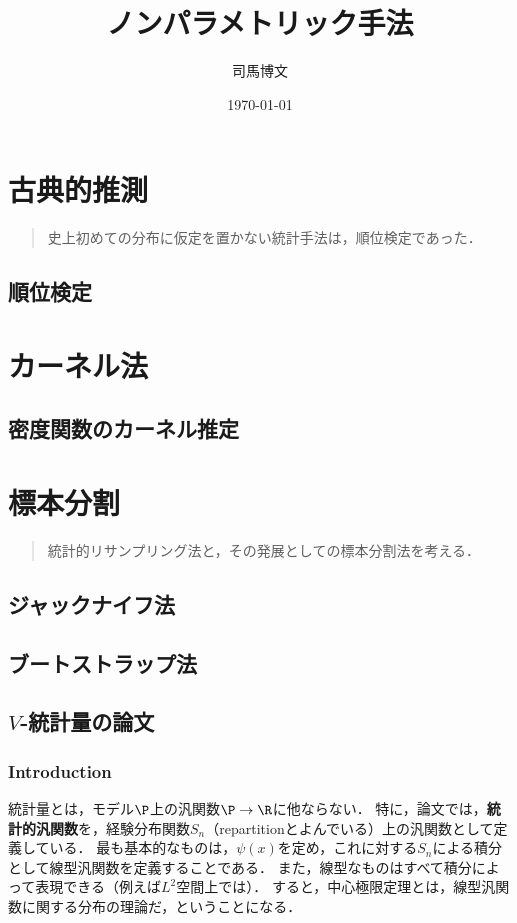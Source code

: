 \documentclass[uplatex,dvipdfmx]{jsreport}
\title{ノンパラメトリック手法}
\author{司馬博文}
\date{\today}
\begin{document}
\tableofcontents

\chapter{古典的推測}

\begin{quotation}
    史上初めての分布に仮定を置かない統計手法は，順位検定であった．
\end{quotation}

\section{順位検定}

\chapter{カーネル法}

\section{密度関数のカーネル推定}

\chapter{標本分割}

\begin{quotation}
    統計的リサンプリング法と，その発展としての標本分割法を考える．
\end{quotation}

\section{ジャックナイフ法}

\section{ブートストラップ法}

\section{$V$-統計量の論文}

\subsection{Introduction}

\begin{definition}
    統計量とは，モデル$\P$上の汎関数$\P\to\R$に他ならない．
    特に，論文\cite{von Mises}では，\textbf{統計的汎関数}を，経験分布関数$S_n$（repartitionとよんでいる）上の汎関数として定義している．
    最も基本的なものは，$\psi(x)$を定め，これに対する$S_n$による積分として線型汎関数を定義することである．
    また，線型なものはすべて積分によって表現できる（例えば$L^2$空間上では）．
    すると，中心極限定理とは，線型汎関数に関する分布の理論だ，ということになる．
\end{definition}
\end{document}
